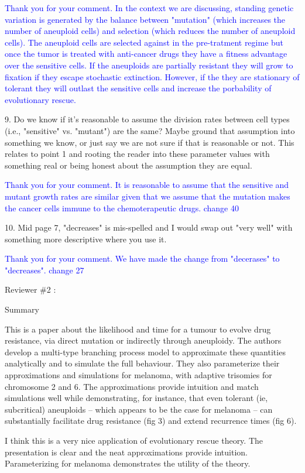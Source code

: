 \documentclass[11pt,a4paper]{article}
\begin{document}
\textcolor{blue}{Thank you for your comment. In the context we are discussing, standing genetic variation is generated by the balance between "mutation" (which increases the number of aneuploid cells) and selection (which reduces the number of aneuploid cells). The aneuploid cells are selected against in the pre-tratment regime but once the tumor is treated with anti-cancer drugs they have a fitness advantage over the sensitive cells. If the aneuploids are partially resistant they will grow to fixation if they escape stochastic extinction. However, if the they are stationary of tolerant they will outlast the sensitive cells and increase the porbability of evolutionary rescue.} 

9. Do we know if it's reasonable to assume the division rates between cell types (i.e., "sensitive" vs. "mutant") are the same? Maybe ground that assumption into something we know, or just say we are not sure if that is reasonable or not. This relates to point 1 and rooting the reader into these parameter values with something real or being honest about the assumption they are equal.

\textcolor{blue}{Thank you for your comment. It is reasonable to assume that the sensitive and mutant growth rates are similar given that we assume that the mutation makes the cancer cells immune to the chemoterapeutic drugs. change 40} 

10. Mid page 7, "decreases" is mis-spelled and I would swap out "very well" with something more descriptive where you use it.

\textcolor{blue}{Thank you for your comment. We have made the change from "decerases" to "decreases". change 27} 

Reviewer $\#$2 :

Summary

This is a paper about the likelihood and time for a tumour to evolve drug resistance, via direct mutation or indirectly through aneuploidy. The authors develop a multi-type branching process model to approximate these quantities analytically and to simulate the full behaviour. They also parameterize their approximations and simulations for melanoma, with adaptive trisomies for chromosome 2 and 6. The approximations provide intuition and match simulations well while demonstrating, for instance, that even tolerant (ie, subcritical) aneuploids -- which appears to be the case for melanoma -- can substantially facilitate drug resistance (fig 3) and extend recurrence times (fig 6).

I think this is a very nice application of evolutionary rescue theory. The presentation is clear and the neat approximations provide intuition. Parameterizing for melanoma demonstrates the utility of the theory.
\end{document}
